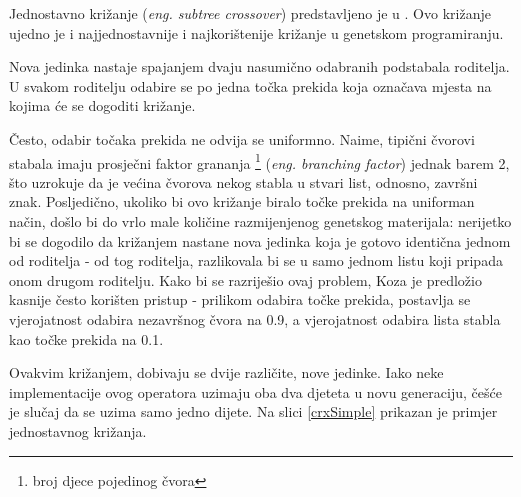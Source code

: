 Jednostavno križanje (\textit{eng. subtree crossover}) predstavljeno je u \cite{crxSimple}. Ovo križanje ujedno je i najjednostavnije i najkorištenije križanje u genetskom programiranju.

Nova jedinka nastaje spajanjem dvaju nasumično odabranih podstabala roditelja. U svakom roditelju odabire se po jedna točka prekida koja označava mjesta na kojima će se dogoditi križanje.

Često, odabir točaka prekida ne odvija se uniformno. Naime, tipični čvorovi stabala imaju prosječni faktor grananja \footnote{broj djece pojedinog čvora} (\textit{eng. branching factor}) jednak barem 2, što uzrokuje da je većina čvorova nekog stabla u stvari list, odnosno, završni znak. Posljedično, ukoliko bi ovo križanje biralo točke prekida na uniforman način, došlo bi do vrlo male količine razmijenjenog genetskog materijala: nerijetko bi se dogodilo da križanjem nastane nova jedinka koja je gotovo identična jednom od roditelja - od tog roditelja, razlikovala bi se u samo jednom listu koji pripada onom drugom roditelju. Kako bi se razriješio ovaj problem, Koza \cite{koza} je predložio kasnije često korišten pristup - prilikom odabira točke prekida, postavlja se vjerojatnost odabira nezavršnog čvora na 0.9, a vjerojatnost odabira lista stabla kao točke prekida na 0.1.

Ovakvim križanjem, dobivaju se dvije različite, nove jedinke. Iako neke implementacije ovog operatora uzimaju oba dva djeteta u novu generaciju, češće je slučaj da se uzima samo jedno dijete. Na slici \ref{crxSimple} prikazan je primjer jednostavnog križanja.

